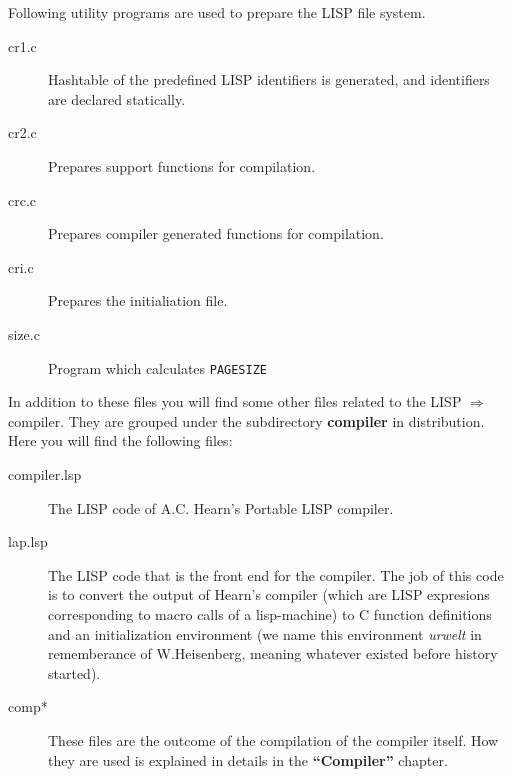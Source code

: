 Following utility programs are used to prepare the LISP file system.
\begin{description}
  \item[cr1.c] Hashtable of the predefined LISP
      identifiers is generated, and identifiers are declared statically.
  \item[cr2.c] Prepares support functions for compilation.
  \item[crc.c] Prepares compiler generated functions for compilation.
  \item[cri.c] Prepares the initialiation  file.
  \item[size.c] Program which calculates {\tt PAGESIZE}
\end{description}

In addition to these files you will find some other files related to
the LISP $\Rightarrow$ \C compiler. They are grouped under the subdirectory
{\bf compiler} in distribution. Here you will find the following files:
\begin{description}
  \item[compiler.lsp] The LISP code of A.C. Hearn's Portable
                      LISP compiler\cite{comp}.
  \item[lap.lsp] The LISP code that is the front end for the compiler.
                 The job of this code is to convert the
                 output of Hearn's compiler (which are LISP expresions
                 corresponding to macro calls of a lisp-machine) to
                 C function definitions and an initialization environment
                 (we name this environment {\em urwelt} in rememberance
                  of W.Heisenberg, meaning whatever existed
                  before history started).
  \item[comp*] These files are the outcome of the compilation of the
               compiler itself. How they are used is explained in details
               in the {\bf ``Compiler''} chapter.
\end{description}

